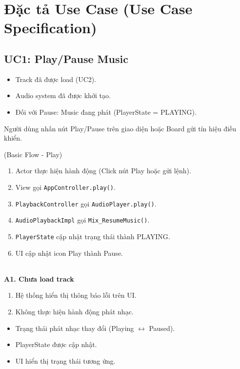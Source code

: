 
\section{Đặc tả Use Case (Use Case Specification)}

\subsection{UC1: Play/Pause Music}

\begin{description}[style=multiline, leftmargin=3cm, font=\bfseries]
    \item[Pre-conditions] 
    \begin{itemize}
        \item Track đã được load (UC2).
        \item Audio system đã được khởi tạo.
        \item Đối với Pause: Music đang phát (PlayerState = PLAYING).
    \end{itemize}
    
    \item[Trigger] Người dùng nhấn nút Play/Pause trên giao diện hoặc Board gửi tín hiệu điều khiển.

    \item[Main Success Scenario] (Basic Flow - Play)
    \begin{enumerate}
        \item Actor thực hiện hành động (Click nút Play hoặc gửi lệnh).
        \item View gọi \texttt{AppController.play()}.
        \item \texttt{PlaybackController} gọi \texttt{AudioPlayer.play()}.
        \item \texttt{AudioPlaybackImpl} gọi \texttt{Mix\_ResumeMusic()}.
        \item \texttt{PlayerState} cập nhật trạng thái thành PLAYING.
        \item UI cập nhật icon Play thành Pause.
    \end{enumerate}

    \item[Alternative Flows] \hfill \\
    \textbf{A1. Chưa load track}
    \begin{enumerate}
        \item Hệ thống hiển thị thông báo lỗi trên UI.
        \item Không thực hiện hành động phát nhạc.
    \end{enumerate}

    \item[Post-conditions] 
    \begin{itemize}
        \item Trạng thái phát nhạc thay đổi (Playing $\leftrightarrow$ Paused).
        \item PlayerState được cập nhật.
        \item UI hiển thị trạng thái tương ứng.
    \end{itemize}
\end{description}

